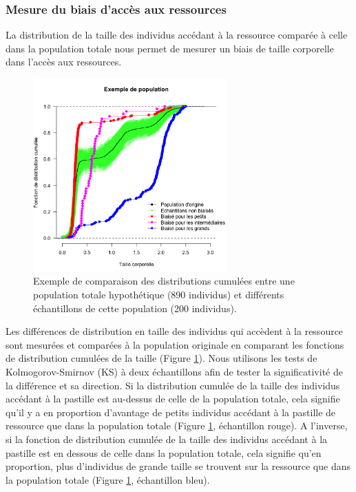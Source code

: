 \subsubsection{Mesure du biais d'accès aux ressources}

La distribution de la taille des individus accédant à la ressource comparée à
celle dans la population totale nous permet de mesurer un biais de taille
corporelle dans l'accès aux ressources.

\begin{figure}[!ht]
\begin{center}
\includegraphics[width=0.66\textwidth]{1_CorpsDeThese/Resumes/Fig/SM02}
\caption[Comparaison des
distributions cumulées]{Exemple de comparaison des distributions cumulées entre
une population totale hypothétique (890 individus) et différents échantillons de
cette population (200 individus).
}
\label{fig:SM2}
\end{center}
\end{figure}

Les différences de distribution en taille des individus qui accèdent à la
ressource sont mesurées et comparées à la population originale en comparant les
fonctions de distribution cumulées de la taille (Figure \ref{fig:SM2}). Nous
utilisons les tests de Kolmogorov-Smirnov (KS) à deux échantillons afin de
tester la significativité de la différence et sa direction. Si la distribution cumulée
de la taille des individus accédant à la pastille est au-dessus de celle de la
population totale, cela signifie qu'il y a en proportion d'avantage de petits
individus accédant à la pastille de ressource que dans la population totale
(Figure \ref{fig:SM2}, échantillon rouge). A l'inverse, si la fonction de
distribution cumulée de la taille des individus accédant à la pastille est en
dessous de celle dans la population totale, cela signifie qu'en proportion, plus
d'individus de grande taille se trouvent sur la ressource que dans la population
totale (Figure \ref{fig:SM2}, échantillon bleu).

